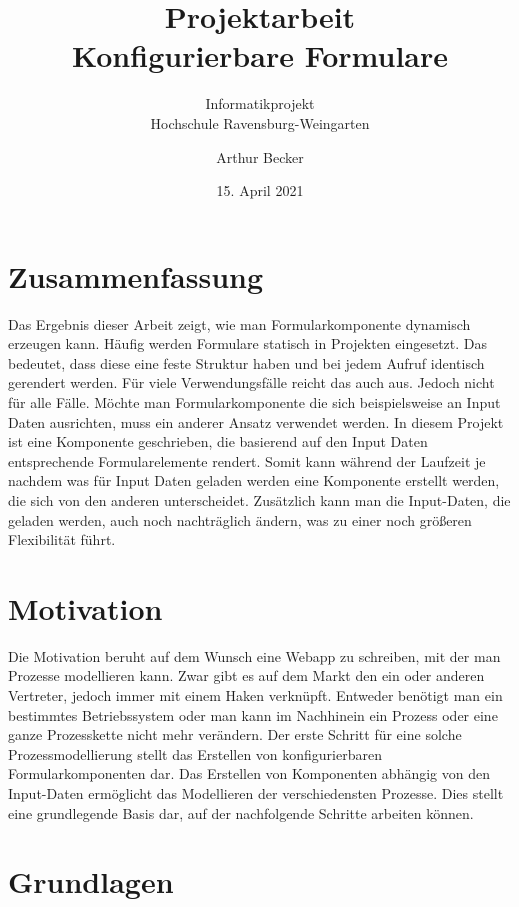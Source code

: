 \documentclass[a4paper,11pt]{scrreprt}
\title{Projektarbeit \\ Konfigurierbare Formulare}
\subtitle{Informatikprojekt \\ Hochschule Ravensburg-Weingarten}
\author{Arthur Becker}
\date{15. April 2021}
\begin{document}
\maketitle

\chapter{Zusammenfassung}
Das Ergebnis dieser Arbeit zeigt, wie man Formularkomponente dynamisch erzeugen kann. 
Häufig werden Formulare statisch in Projekten eingesetzt. Das bedeutet, dass diese eine feste Struktur haben und bei jedem Aufruf identisch gerendert werden. Für viele Verwendungsfälle reicht das auch aus. Jedoch nicht für alle Fälle. Möchte man Formularkomponente die sich beispielsweise an Input Daten ausrichten, muss ein anderer Ansatz verwendet werden. In diesem Projekt ist eine Komponente geschrieben, die basierend auf den Input Daten entsprechende Formularelemente rendert. Somit kann während der Laufzeit je nachdem was für Input Daten geladen werden eine Komponente erstellt werden, die sich von den anderen unterscheidet. Zusätzlich kann man die Input-Daten, die geladen werden, auch noch nachträglich ändern, was zu einer noch größeren Flexibilität führt.

  


\tableofcontents
\newpage

\chapter{Motivation}
Die Motivation beruht auf dem Wunsch eine Webapp zu schreiben, mit der man Prozesse modellieren kann. Zwar gibt es auf dem Markt den ein oder anderen Vertreter, jedoch immer mit einem Haken verknüpft. Entweder benötigt man ein bestimmtes Betriebssystem oder man kann im Nachhinein ein Prozess oder eine ganze Prozesskette nicht mehr verändern. 
Der erste Schritt für eine solche Prozessmodellierung stellt das Erstellen von konfigurierbaren Formularkomponenten dar. Das Erstellen von Komponenten abhängig von den Input-Daten ermöglicht das Modellieren der verschiedensten Prozesse. 
Dies stellt eine grundlegende Basis dar, auf der nachfolgende Schritte arbeiten können. 



\chapter{Grundlagen}
\end{document}
